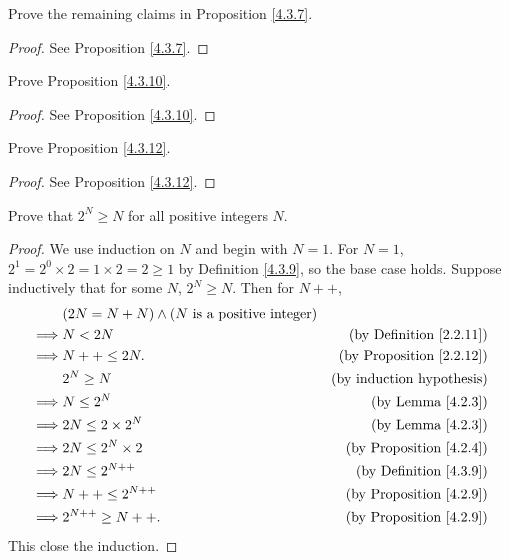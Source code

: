 \begin{exercise}\label{ex 4.3.2}
Prove the remaining claims in Proposition \ref{4.3.7}.
\end{exercise}

\begin{proof}
See Proposition \ref{4.3.7}.
\end{proof}

\begin{exercise}\label{ex 4.3.3}
Prove Proposition \ref{4.3.10}.
\end{exercise}

\begin{proof}
See Proposition \ref{4.3.10}.
\end{proof}

\begin{exercise}
Prove Proposition \ref{4.3.12}.
\end{exercise}

\begin{proof}
See Proposition \ref{4.3.12}.
\end{proof}

\begin{exercise}\label{ex 4.3.5}
Prove that \(2^N \geq N\) for all positive integers \(N\).
\end{exercise}

\begin{proof}
We use induction on \(N\) and begin with \(N = 1\).
For \(N = 1\), \(2^1 = 2^0 \times 2 = 1 \times 2 = 2 \geq 1\) by Definition \ref{4.3.9}, so the base case holds.
Suppose inductively that for some \(N\), \(2^N \geq N\).
Then for \(N++\),
\begin{align*}
& (2N = N + N) \land (N \text{ is a positive integer}) \\
\implies & N < 2N & \text{(by Definition \ref{2.2.11})} \\
\implies & N++ \leq 2N. & \text{(by Proposition \ref{2.2.12})} \\
& 2^N \geq N & \text{(by induction hypothesis)} \\
\implies & N \leq 2^N & \text{(by Lemma \ref{4.2.3})} \\
\implies & 2N \leq 2 \times 2^N & \text{(by Lemma \ref{4.2.3})} \\
\implies & 2N \leq 2^N \times 2 & \text{(by Proposition \ref{4.2.4})} \\
\implies & 2N \leq 2^{N++} & \text{(by Definition \ref{4.3.9})} \\
\implies & N++ \leq 2^{N++} & \text{(by Proposition \ref{4.2.9})} \\
\implies & 2^{N++} \geq N++. & \text{(by Proposition \ref{4.2.9})}
\end{align*}
This close the induction.
\end{proof}